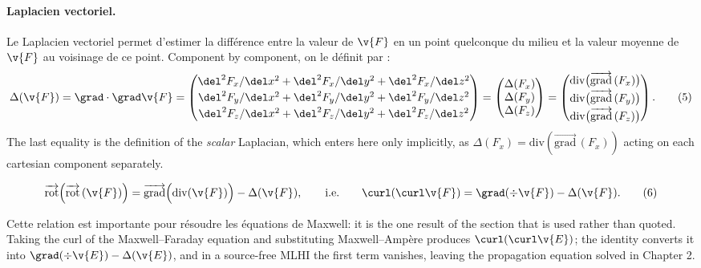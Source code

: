 \paragraph{Laplacien vectoriel.}
Le Laplacien vectoriel permet d'estimer la différence entre la valeur de
$\v{F}$ en un point quelconque du milieu et la valeur moyenne de $\v{F}$ au
voisinage de ce point. Component by component, on le définit par :
\[
  \Delta(\v{F}) = \grad\cdot\grad\v{F} =
  \begin{pmatrix}
    \del^2 F_x/\del x^2 + \del^2 F_x/\del y^2 + \del^2 F_x/\del z^2 \\[2pt]
    \del^2 F_y/\del x^2 + \del^2 F_y/\del y^2 + \del^2 F_y/\del z^2 \\[2pt]
    \del^2 F_z/\del x^2 + \del^2 F_z/\del y^2 + \del^2 F_z/\del z^2
  \end{pmatrix}
  =
  \begin{pmatrix} \Delta(F_x) \\ \Delta(F_y) \\ \Delta(F_z) \end{pmatrix}
  =
  \begin{pmatrix}
    \mathrm{div}\big(\overrightarrow{\mathrm{grad}}\,(F_x)\big) \\[2pt]
    \mathrm{div}\big(\overrightarrow{\mathrm{grad}}\,(F_y)\big) \\[2pt]
    \mathrm{div}\big(\overrightarrow{\mathrm{grad}}\,(F_z)\big)
  \end{pmatrix}.
  \tag*{(5)}
\]
The last equality is the definition of the \emph{scalar} Laplacian, which
enters here only implicitly, as $\Delta(F_x) = \mathrm{div}(\overrightarrow{\mathrm{grad}}\,(F_x))$
acting on each cartesian component separately.

\begin{theorem}
  \[
    \overrightarrow{\mathrm{rot}}\Big(\overrightarrow{\mathrm{rot}}\,(\v{F})\Big)
    = \overrightarrow{\mathrm{grad}}\Big(\mathrm{div}(\v{F})\Big) - \Delta(\v{F}),
    \qquad\text{i.e.}\qquad
    \curl(\curl\v{F}) = \grad(\div\v{F}) - \Delta(\v{F}).
    \tag*{(6)}
  \]
\end{theorem}

Cette relation est importante pour résoudre les équations de Maxwell: it is
the one result of the section that is used rather than quoted. Taking
the curl of the Maxwell--Faraday equation and substituting Maxwell--Ampère
produces $\curl(\curl\v{E})$; the identity converts it into
$\grad(\div\v{E}) - \Delta(\v{E})$, and in a source-free MLHI the first term
vanishes, leaving the propagation equation solved in Chapter 2.

